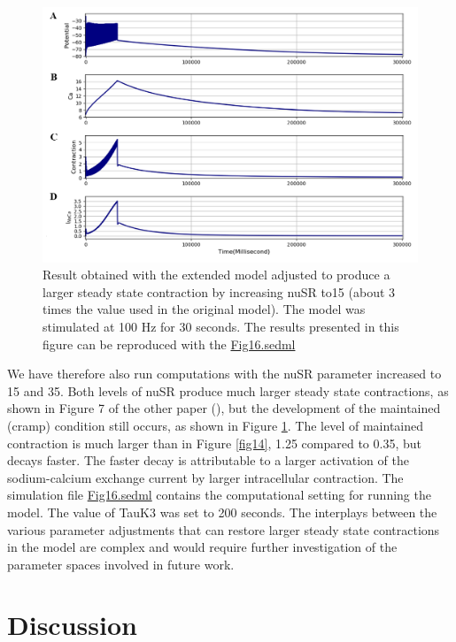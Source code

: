 \documentclass[fleqn,10pt]{physiome}
\begin{document}
\begin{figure}[h!]
\centering
\includegraphics[width=0.9\linewidth]{figure15}
\caption{Result obtained with the extended model adjusted to produce a larger steady state contraction by increasing nuSR to15 (about 3 times the value used in the original model). The model was stimulated at 100 Hz for 30 seconds. The results presented in this figure can be reproduced with the \href{https://models.physiomeproject.org/workspace/5f4/file/26289d9227fbf4f66ca8106d8bf80ff9a51a5ac6/Fig16.sedml}{Fig16.sedml}}
\label{fig15}
\end{figure}


\newpage
We have therefore also run computations with the nuSR parameter increased to 15 and 35. Both levels of nuSR produce much larger steady state contractions, as shown in Figure 7 of the other paper (\citep{Noble2019Incorporation}), but the development of the maintained (cramp) condition still occurs, as shown in Figure \ref{fig15}. The level of maintained contraction is much larger than in Figure \ref{fig14}, 1.25 compared to 0.35, but decays faster. The faster decay is attributable to a larger activation of the sodium-calcium exchange current by larger intracellular contraction. The simulation file \href{http://models.cellml.org/workspace/5f4/file/099d70c2ee6ed5dfb1ca33e0ce16db4f0247a4dc/Fig16.sedml}{Fig16.sedml} contains the computational setting for running the model. The value of TauK3 was set to 200 seconds. The interplays between the various parameter adjustments that can restore larger steady state contractions in the model are complex and would require further investigation of the parameter spaces involved in future work.

\section{Discussion}
\end{document}

